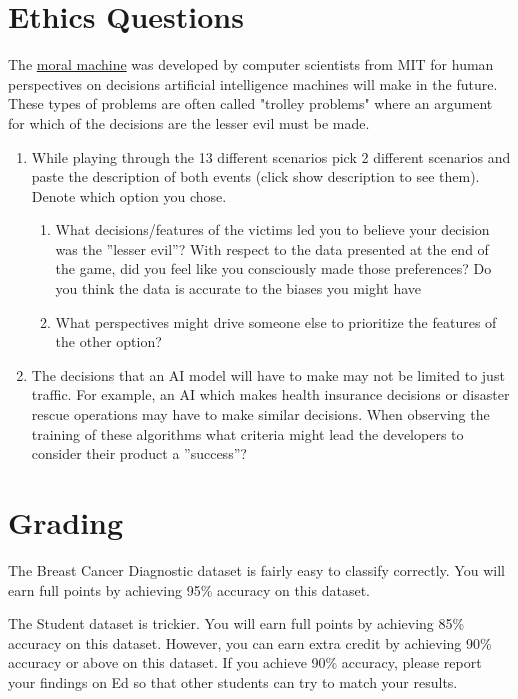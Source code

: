 \documentclass{article}
\begin{document}
\section{Ethics Questions}
The \href{https://www.moralmachine.net/}{moral machine} was developed by computer scientists from MIT for human perspectives on decisions artificial intelligence machines will make in the future. These types of problems are often called "trolley problems" where an argument for which of the decisions are the lesser evil must be made.


\begin{enumerate}
\item While playing through the 13 different scenarios pick 2 different scenarios and paste the description of
both events (click show description to see them). Denote which option you chose.
\begin{enumerate}
    \item What decisions/features of the victims led you to believe your decision was the ”lesser evil”? With respect to the data presented at the end of the game, did you feel like you consciously made those preferences? Do you think the data is accurate to the biases you might have
    \item What perspectives might drive someone else to prioritize the features of the other option?
\end{enumerate}

\item The decisions that an AI model will have to make may not be limited to just traffic. For example, an AI which makes health insurance decisions or disaster rescue operations may have to make similar decisions. When observing the training of these algorithms what criteria might lead the developers to consider their product a ”success”?
\end{enumerate}


\section{Grading}

The Breast Cancer Diagnostic dataset is fairly easy to classify correctly.
You will earn full points by achieving 95\% accuracy on this dataset.

The Student dataset is trickier. 
You will earn full points by achieving 85\% accuracy on this dataset.
However, you can earn extra credit by achieving 90\% accuracy or above on this dataset.
If you achieve 90\% accuracy, please report your findings on Ed so that other students can try to match your results. 
\end{document}
